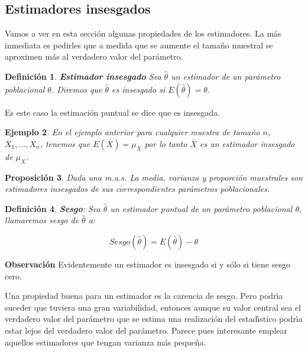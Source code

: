 \documentclass[12pt]{report}
\newtheorem{definition}{Definici\'on}
\newtheorem{proposition}[definition]{Proposici\'on}
\newtheorem{example}[definition]{Ejemplo}
\begin{document}
     \subsection{Estimadores insesgados}

     Vamos a ver en esta secci\'on algunas propiedades de los estimadores.
     La m\'as inmediata es pedirles que a medida que se aumente el tama\~{n}o
     muestral se aproximen m\'as al verdadero valor del par\'ametro.

     \begin{definition} \textbf{Estimador insesgado}
     Sea $\hat{\theta}$ un estimador de un par\'ametro poblacional
     $\theta$. Diremos que $\hat{\theta}$ es insesgado si
     $E(\hat{\theta})=\theta$.
     \end{definition}

     Es este caso la estimaci\'on puntual se dice que es insesgada.
     \begin{example}
         En el ejemplo anterior para cualquier muestra de tama\~{n}o
         $n$,  $X_{1},\ldots,X_{n}$, tenemos que
         $E(\overline{X})=\mu_{X}$ por lo tanto $\overline{X}$ es un estimador
         insesgado de $\mu_{X}$.
     \end{example}


\begin{proposition}
Dada una m.a.s. La media, varianza y proporci\'on muestrales son estimadores insesgados de
sus correspondientes par\'ametros poblacionales.
\end{proposition}

\begin{definition}\textbf{Sesgo}: Sea $\hat{\theta}$ un estimador puntual de un par\'ametro
poblacional $\theta$, llamaremos sesgo de $\hat{\theta}$ a:

$$Sesgo(\hat{\theta})=E(\hat{\theta})-\theta$$
\end{definition}

\textbf{Observaci\'on} Evidentemente un estimador es insesgado si y s\'olo si tiene sesgo cero.


    Una propiedad buena para un estimador es
    la  carencia de sesgo. Pero podr\'{\i}a suceder que tuviera una gran
    variabilidad, entonces aunque su valor central sea el verdadero valor del par\'ametro
    que se estima una realizaci\'on del  estad\'{\i}stico  podr\'{\i}a estar lejos del
    verdadero valor del par\'ametro. Parece pues interesante emplear aquellos estimadores
    que tengan varianza m\'as peque\~{n}a.
\end{document}
